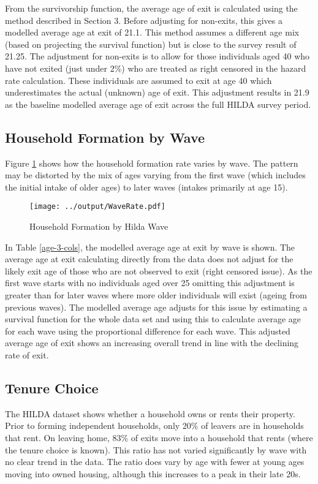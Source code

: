 \documentclass[12pt]{article}
\begin{document}
From the survivorship function, the average age of exit is calculated using the method described in Section 3. Before adjusting for non-exits, this gives a modelled average age at exit of 21.1. This method assumes a different age mix (based on projecting the survival function) but is close to the survey result of 21.25. The adjustment for non-exits is to allow for those individuals aged 40 who have not exited (just under 2\%) who are treated as right censored in the hazard rate calculation. These individuals are assumed to exit at age 40 which underestimates the actual (unknown) age of exit. This adjustment results in 21.9 as the baseline modelled average age of exit across the full HILDA survey period.

\subsection{Household Formation by Wave}

Figure \ref{ExitbyWave} shows how the household formation rate varies by wave. The pattern may be distorted by the mix of ages varying from the first wave (which includes the initial intake of older ages) to later waves (intakes primarily at age 15).

\begin{figure}[htpb]
  \caption{Household Formation by Hilda Wave}
  \label{ExitbyWave}
  \centering
  \texttt{[image: ../output/WaveRate.pdf]}
\end{figure}

In Table \ref{age-3-cols}, the modelled average age at exit by wave is shown. The average age at exit calculating directly from the data does not adjust for the likely exit age of those who are not observed to exit (right censored issue). As the first wave starts with no individuals aged over 25 omitting this adjustment is greater than for later waves where more older individuals will exist (ageing from previous waves). The modelled average age adjusts for this issue by estimating a survival function for the whole data set and using this to calculate average age for each wave using the proportional difference for each wave. This adjusted average age of exit shows an increasing overall trend in line with the declining rate of exit.




\subsection{Tenure Choice}
The HILDA dataset shows whether a household owns or rents their property. Prior to forming independent households, only 20\% of leavers are in households that rent.  On leaving home, 83\% of exits move into a household that rents (where the tenure choice is known). This ratio has not varied significantly by wave with no clear trend in the data. The ratio does vary by age with fewer at young ages moving into owned housing, although this increases to a peak in their late 20s.
\end{document}
